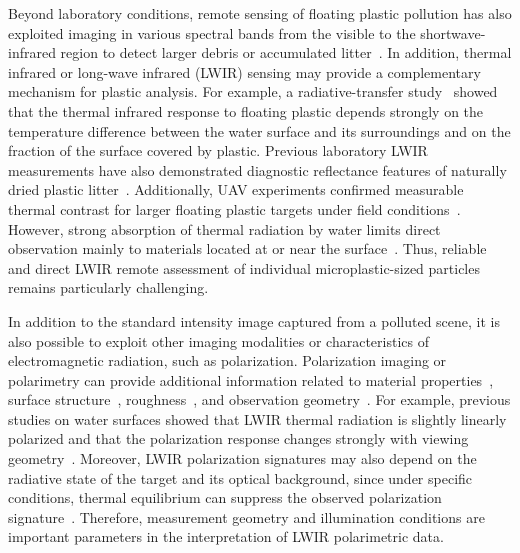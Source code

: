 \documentclass[pdflatex,sn-apa]{sn-jnl}
\begin{document}
Beyond laboratory conditions, remote sensing of floating plastic pollution has also exploited imaging in various spectral bands from the visible to the shortwave-infrared region to detect larger debris or accumulated litter~\citep{GoddijnMurphy2018,MartinezVicente2019,Cozar2024}. In addition, thermal infrared or long-wave infrared (LWIR) sensing may provide a complementary mechanism for plastic analysis. For example, a radiative-transfer study~\citep{GoddijnMurphy2019} showed that the thermal infrared response to floating plastic depends strongly on the temperature difference between the water surface and its surroundings and on the fraction of the surface covered by plastic. Previous laboratory LWIR measurements have also demonstrated diagnostic reflectance features of naturally dried plastic litter~\citep{Garaba2020}. Additionally, UAV experiments confirmed measurable thermal contrast for larger floating plastic targets under field conditions~\citep{GoddijnMurphy2022}. However, strong absorption of thermal radiation by water limits direct observation mainly to materials located at or near the surface~\citep{GoddijnMurphy2022,GoddijnMurphy2024}. Thus, reliable and direct LWIR remote assessment of individual microplastic-sized particles remains particularly challenging. 

In addition to the standard intensity image captured from a polluted scene, it is also possible to exploit other imaging modalities or characteristics of electromagnetic radiation, such as polarization. Polarization imaging or polarimetry can provide additional information related to material properties~\citep{Tominaga2008}, surface structure~\citep{Stolz2012}, roughness~\citep{Terrier2008}, and observation geometry~\citep{Tyo2006}. For example, previous studies on water surfaces showed that LWIR thermal radiation is slightly linearly polarized and that the polarization response changes strongly with viewing geometry~\citep{Shaw1999,Shaw2001}. Moreover, LWIR polarization signatures may also depend on the radiative state of the target and its optical background, since under specific conditions, thermal equilibrium can suppress the observed polarization signature~\citep{Tyo2007}. Therefore, measurement geometry and illumination conditions are important parameters in the interpretation of LWIR polarimetric data.
\end{document}

